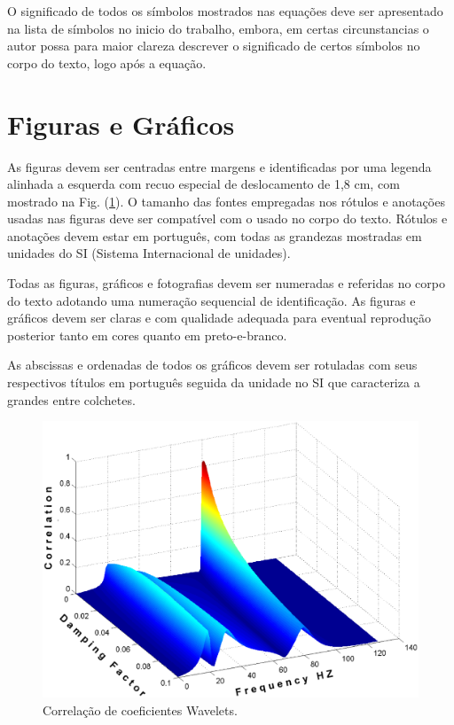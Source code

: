 O significado de todos os símbolos mostrados nas equações deve ser apresentado na lista de símbolos no inicio do trabalho, embora, em certas circunstancias o autor possa para maior clareza descrever o significado de certos símbolos no corpo do texto, logo após a equação.


\section{Figuras e Gráficos}

As figuras devem ser centradas entre margens e identificadas por uma legenda alinhada a esquerda com recuo especial de deslocamento de 1,8 cm, com mostrado 
na Fig. (\ref{fig01}). O tamanho das fontes empregadas nos rótulos e anotações 
usadas nas figuras deve ser compatível com o usado no corpo do texto. Rótulos e 
anotações devem estar em português, com todas as grandezas mostradas em 
unidades do SI (Sistema Internacional de unidades).

Todas as figuras, gráficos e fotografias devem ser numeradas e referidas no 
corpo do texto adotando uma numeração sequencial de identificação. As figuras e 
gráficos devem ser claras e com qualidade adequada para eventual reprodução 
posterior tanto em cores quanto em preto-e-branco.


As abscissas e ordenadas de todos os gráficos devem ser rotuladas com seus 
respectivos títulos em português seguida da unidade no SI que caracteriza a 
grandes entre colchetes. 

\begin{figure}[hbt!]
	\centering
		\includegraphics[keepaspectratio=true,scale=0.3]{imagens/fig01.eps}
	\caption{Correlação de coeficientes Wavelets.}
	\label{fig01}
\end{figure}


